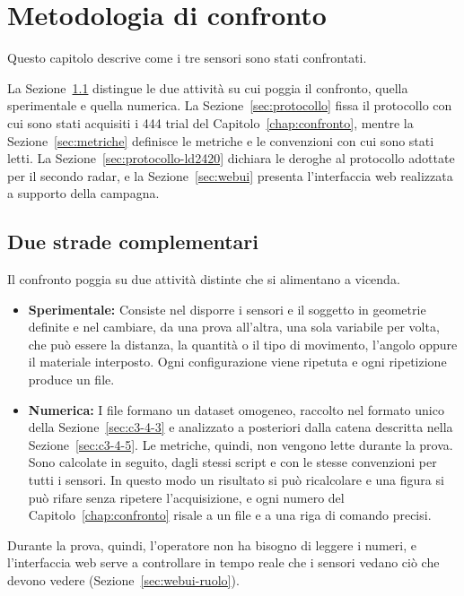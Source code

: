 \chapter{Metodologia di confronto}
\label{chap:metodologia}

Questo capitolo descrive come i tre sensori sono stati confrontati.

La Sezione~\ref{sec:metodo-approccio} distingue le due attività su cui poggia il confronto,
quella sperimentale e quella numerica. La Sezione~\ref{sec:protocollo} fissa il protocollo
con cui sono stati acquisiti i 444 trial del Capitolo~\ref{chap:confronto}, mentre la
Sezione~\ref{sec:metriche} definisce le metriche e le convenzioni con cui sono stati letti.
La Sezione~\ref{sec:protocollo-ld2420} dichiara le deroghe al protocollo adottate per il
secondo radar, e la Sezione~\ref{sec:webui} presenta l'interfaccia web realizzata a supporto
della campagna.

\section{Due strade complementari}
\label{sec:metodo-approccio}

Il confronto poggia su due attività distinte che si alimentano a vicenda.
\begin{itemize}
  \item \textbf{Sperimentale:} Consiste nel disporre i sensori e il soggetto in geometrie
    definite e nel cambiare, da una prova all'altra, una sola variabile per volta, che può
    essere la distanza, la quantità o il tipo di movimento, l'angolo oppure il materiale
    interposto. Ogni configurazione viene ripetuta e ogni ripetizione produce un file.
  \item \textbf{Numerica:} I file formano un dataset omogeneo, raccolto nel formato unico
    della Sezione~\ref{sec:c3-4-3} e analizzato a posteriori dalla catena descritta nella
    Sezione~\ref{sec:c3-4-5}. Le metriche, quindi, non vengono lette durante la prova. Sono
    calcolate in seguito, dagli stessi script e con le stesse convenzioni per tutti i
    sensori. In questo modo un risultato si può ricalcolare e una figura si può rifare
    senza ripetere l'acquisizione, e ogni numero del Capitolo~\ref{chap:confronto} risale a
    un file e a una riga di comando precisi.
\end{itemize}

Durante la prova, quindi, l'operatore non ha bisogno di leggere i numeri, e l'interfaccia web serve a controllare in tempo reale che i sensori vedano ciò che devono vedere (Sezione~\ref{sec:webui-ruolo}).


